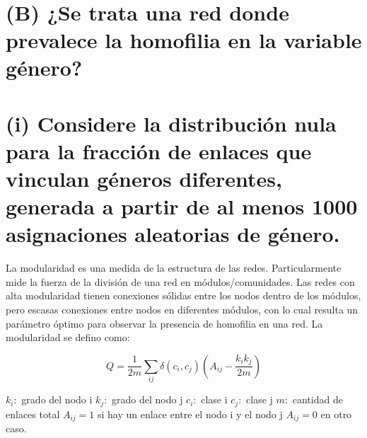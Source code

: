 \documentclass[11pt]{article}
\begin{document}
    \begin{center}
    \end{center}
    { \hspace*{\fill} \\}
    
    \section{(B) ¿Se trata una red donde prevalece la homofilia en la
variable
género?}\label{b-se-trata-una-red-donde-prevalece-la-homofilia-en-la-variable-guxe9nero}

    \section{(i) Considere la distribución nula para la fracción de enlaces
que vinculan géneros diferentes, generada a partir de al menos 1000
asignaciones aleatorias de
género.}\label{i-considere-la-distribuciuxf3n-nula-para-la-fracciuxf3n-de-enlaces-que-vinculan-guxe9neros-diferentes-generada-a-partir-de-al-menos-1000-asignaciones-aleatorias-de-guxe9nero.}

    La modularidad es una medida de la estructura de las redes.
Particularmente mide la fuerza de la división de una red en
módulos/comunidades. Las redes con alta modularidad tienen conexiones
sólidas entre los nodos dentro de los módulos, pero escasas conexiones
entre nodos en diferentes módulos, con lo cual resulta un parámetro
óptimo para observar la presencia de homofilia en una red. La
modularidad se defino como:

\[Q=\frac{1}{2m} \sum_{ij} \delta(c_{i}, c_{j}) (A_{ij}-\frac{k_{i}k_{j}}{2m})\]

 \(k_{i}:\) grado del nodo i \(k_{j}:\) grado del nodo j \(c_{i}:\)
clase i \(c_{j}:\) clase j \(m:\) cantidad de enlaces total
\(A_{ij} = 1\) si hay un enlace entre el nodo i y el nodo j
\(A_{ij} = 0\) en otro caso. 
\end{document}
